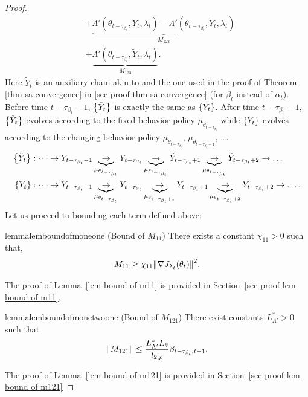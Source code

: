 \documentclass[twoside,11pt]{article}
\numberwithin{assucounter}{section}
\begin{document}
\begin{proof}
\begin{align}
    &+ \underbrace{\Lambda'(\theta_{t-\tau_{\beta_t}}, Y_t, \lambda_t) - \Lambda'(\theta_{t-\tau_{\beta_t}}, \tilde Y_t, \lambda_t)}_{M_{122}} \\
    &+ \underbrace{\Lambda'(\theta_{t-\tau_{\beta_t}}, \tilde Y_t, \lambda_t)}_{M_{123}}.
  \end{align}
  Here $\tilde Y_t$ is an auxiliary chain akin to \citet{zou2019finite} and the one used in the proof of Theorem \ref{thm sa convergence} in \ref{sec proof thm sa convergence} (for $\beta_t$ instead of $\alpha_t$). 
  Before time $t - \tau_{\beta_t} - 1$,
  $\qty{\tilde Y_t}$ is exactly the same as $\qty{Y_t}$.
  After time $t - \tau_{\beta_t} - 1$,
  $\qty{\tilde Y_t}$ evolves according to the fixed behavior policy $\mu_{\theta_{t-\tau_{\beta_t}}}$
  while $\qty{Y_t}$ evolves according to the changing behavior policy $\mu_{\theta_{t-\tau_{\beta_t}}}$, $\mu_{\theta_{t-\tau_{\beta_t} + 1}}$, \dots.
  \begin{align}
    \label{eq actor tilde yt}
    \qty{\tilde Y_t}&: \dots \to Y_{t-\tau_{\beta_t}-1} \underbrace{\to}_{\mu_{\theta_{t-\tau_{\beta_t}}}} Y_{t-\tau_{\beta_t}} \underbrace{\to}_{\mu_{\theta_{t-\tau_{\beta_t}}}} \tilde Y_{t-\tau_{\beta_t}+1} \underbrace{\to}_{\mu_{\theta_{t-\tau_{\beta_t}}}} \tilde Y_{t-\tau_{\beta_t}+2} \to \dots \\
    \qty{Y_t}&: \dots \to Y_{t-\tau_{\beta_t}-1} \underbrace{\to}_{\mu_{\theta_{t-\tau_{\beta_t}}}} Y_{t-\tau_{\beta_t}} \underbrace{\to}_{\mu_{\theta_{t-\tau_{\beta_t}+1}}} Y_{t-\tau_{\beta_t}+1} \underbrace{\to}_{\mu_{\theta_{t-\tau_{\beta_t}+2}}} Y_{t-\tau_{\beta_t}+2} \to \dots.
\end{align}
Let us proceed to bounding each term defined above:

\begin{restatable}{lemma}{lemboundofmoneone}
  \label{lem bound of m11}
(Bound of $M_{11}$)
There exists a constant $\chi_{11} > 0$ such that,
\begin{align}
  M_{11} \geq \chi_{11} \norm{\nabla J_{\lambda_t}(\theta_t)}^2.
\end{align}
\end{restatable}
\noindent
The proof of Lemma~\ref{lem bound of m11} is provided in Section~\ref{sec proof lem bound of m11}.

\begin{restatable}{lemma}{lemboundofmonetwoone}
  \label{lem bound of m121}
  (Bound of $M_{121}$)
  There exist constants $L_{\Lambda'}^* > 0$ such that
  \begin{align}
    \norm{M_{121}} \leq \frac{L_{\Lambda'}^* L_\theta}{l_{2, p}} \beta_{t-\tau_{\beta_t}, t-1}.
  \end{align}
\end{restatable}
\noindent
The proof of Lemma~\ref{lem bound of m121} is provided in Section~\ref{sec proof lem bound of m121}


\end{proof}
\end{document}
